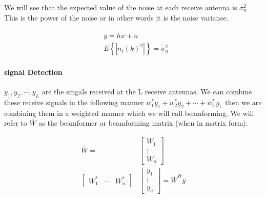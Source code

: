                   We will see that the expected value of the noise at each
                  receive antenna is $\sigma_n^{2}$.  This is the power of
                  the noise or in other words it is the noise variance.
                  \begin{center}
                  \begin{align}
                     &\overline{y}=\overline{h}x+\overline{n} \\[10pt]
                     &E \left\{ \left| n_i(k)^{2} \right|  \right\} 
                     =\sigma_n^{2}
                  \end{align}
                  \end{center}

                    \paragraph{signal Detection}
                    $y_1, y_2, \cdots , y_L $ are the singals received at
                    the L receive antennas.  We can combine these receive
                    signals in the following manner $w_1^{*}y_1+w_2^{*}y_2
                    +\cdots+w_\text{L}^{*}y_\text{L}$
                    then we are combining them in a weighted manner which
                    we will call beamforming.  We will refer to
                    $\overline{W}$ as the beamformer or beamforming matrix
                    (when in matrix form).

                    \begin{center}
                    \begin{align}
                       \overline{W}=&\begin{bmatrix} W_1\\
                       \vdots\\ W_n \end{bmatrix} \\[10pt]
                       \begin{bmatrix} W_1^{*}& \cdots&
                       W_n^{*} \end{bmatrix}
                       &\begin{bmatrix} y_1 \\ \vdots \\ y_n \end{bmatrix}
                       =\overline{W}^{H}\overline{y}
                    \end{align}
                    \end{center}

